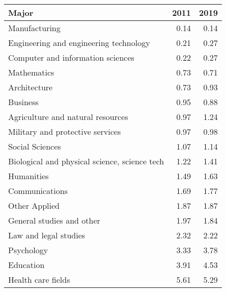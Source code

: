 \begin{tabular}{lrr}
\hline
 Major                                         &   2011 &   2019 \\
\hline
 Manufacturing                                 &   0.14 &   0.14 \\
 Engineering and engineering technology        &   0.21 &   0.27 \\
 Computer and information sciences             &   0.22 &   0.27 \\
 Mathematics                                   &   0.73 &   0.71 \\
 Architecture                                  &   0.73 &   0.93 \\
 Business                                      &   0.95 &   0.88 \\
 Agriculture and natural resources             &   0.97 &   1.24 \\
 Military and protective services              &   0.97 &   0.98 \\
 Social Sciences                               &   1.07 &   1.14 \\
 Biological and physical science, science tech &   1.22 &   1.41 \\
 Humanities                                    &   1.49 &   1.63 \\
 Communications                                &   1.69 &   1.77 \\
 Other Applied                                 &   1.87 &   1.87 \\
 General studies and other                     &   1.97 &   1.84 \\
 Law and legal studies                         &   2.32 &   2.22 \\
 Psychology                                    &   3.33 &   3.78 \\
 Education                                     &   3.91 &   4.53 \\
 Health care fields                            &   5.61 &   5.29 \\
\hline
\end{tabular}